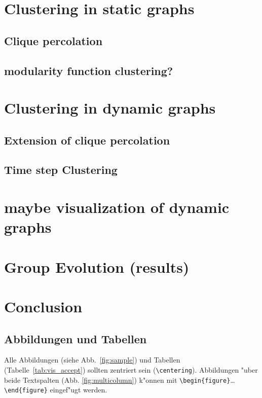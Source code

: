 \documentclass[journal]{vgtc}
\begin{document}
\section{Clustering in static graphs}
  \subsection{Clique percolation}
  \subsection{modularity function clustering?}

\section{Clustering in dynamic graphs}
  \subsection{Extension of clique percolation}
  \subsection{Time step Clustering}

\section{maybe visualization of dynamic graphs}
  
\section{Group Evolution (results)}
 
\section{Conclusion}


\subsection{Abbildungen und Tabellen}

Alle Abbildungen (siehe Abb.\ \ref{fig:sample}) und Tabellen (Tabelle\
\ref{tab:vis_accept}) sollten zentriert sein
(\verb|\centering|). Abbildungen "uber beide Textspalten
(Abb. \ref{fig:multicolumn}) k"onnen mit
\verb|\begin{figure}|\ldots\verb|\end{figure}| eingef"ugt werden.
\end{document}
